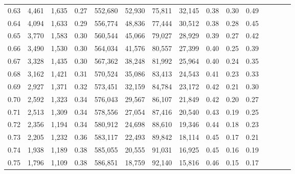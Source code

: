 \begin{tabular}{rrrcrrrrrrrrrrr}
0.63 &   4,461 &  1,635 &                                       0.27 &  552,680 &   52,930 &   75,811 &   32,145 &  0.38 &  0.30 &                         0.49 \\
0.64 &   4,094 &  1,633 &                                       0.29 &  556,774 &   48,836 &   77,444 &   30,512 &  0.38 &  0.28 &                         0.45 \\
0.65 &   3,770 &  1,583 &                                       0.30 &  560,544 &   45,066 &   79,027 &   28,929 &  0.39 &  0.27 &                         0.42 \\
0.66 &   3,490 &  1,530 &                                       0.30 &  564,034 &   41,576 &   80,557 &   27,399 &  0.40 &  0.25 &                         0.39 \\
0.67 &   3,328 &  1,435 &                                       0.30 &  567,362 &   38,248 &   81,992 &   25,964 &  0.40 &  0.24 &                         0.35 \\
0.68 &   3,162 &  1,421 &                                       0.31 &  570,524 &   35,086 &   83,413 &   24,543 &  0.41 &  0.23 &                         0.33 \\
0.69 &   2,927 &  1,371 &                                       0.32 &  573,451 &   32,159 &   84,784 &   23,172 &  0.42 &  0.21 &                         0.30 \\
0.70 &   2,592 &  1,323 &                                       0.34 &  576,043 &   29,567 &   86,107 &   21,849 &  0.42 &  0.20 &                         0.27 \\
0.71 &   2,513 &  1,309 &                                       0.34 &  578,556 &   27,054 &   87,416 &   20,540 &  0.43 &  0.19 &                         0.25 \\
0.72 &   2,356 &  1,194 &                                       0.34 &  580,912 &   24,698 &   88,610 &   19,346 &  0.44 &  0.18 &                         0.23 \\
0.73 &   2,205 &  1,232 &                                       0.36 &  583,117 &   22,493 &   89,842 &   18,114 &  0.45 &  0.17 &                         0.21 \\
0.74 &   1,938 &  1,189 &                                       0.38 &  585,055 &   20,555 &   91,031 &   16,925 &  0.45 &  0.16 &                         0.19 \\
0.75 &   1,796 &  1,109 &                                       0.38 &  586,851 &   18,759 &   92,140 &   15,816 &  0.46 &  0.15 &                         0.17 \\

\end{tabular}
